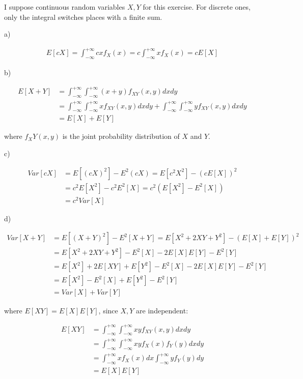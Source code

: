 I suppose continuous random variables $X,Y$ for this exercise. For discrete ones,
only the integral switches places with a finite sum.

a)

\begin{align*}
  E[cX] = \int_{-\infty}^{+\infty} cxf_X(x) = c\int_{-\infty}^{+\infty} xf_X(x) = cE[X]
\end{align*}

b)

\begin{align*}
  E[X+Y] &= \int_{-\infty}^{+\infty} \int_{-\infty}^{+\infty} (x+y)f_{XY}(x,y)dxdy \\
         &= \int_{-\infty}^{+\infty} \int_{-\infty}^{+\infty} xf_{XY}(x,y)dxdy + \int_{-\infty}^{+\infty} \int_{-\infty}^{+\infty} yf_{XY}(x,y)dxdy \\
         &= E[X] + E[Y]
\end{align*}

where $f_XY(x,y)$ is the joint probability distribution of $X$ and $Y$.

c)

\begin{align*}
  Var[cX] &= E[(cX)^2] - E^2(cX) = E[c^2X^2] - (cE[X])^2 \\
          &= c^2E[X^2] - c^2E^2[X] = c^2(E[X^2] - E^2[X]) \\
          &= c^2Var[X]
\end{align*}


d)

\begin{align*}
  Var[X+Y] &= E[(X+Y)^2] - E^2[X+Y] = E[X^2 + 2XY + Y^2] - (E[X]+E[Y])^2 \\
           &= E[X^2 + 2XY + Y^2] - E^2[X] - 2E[X]E[Y] - E^2[Y] \\
           &= E[X^2] + 2E[XY] + E[Y^2] - E^2[X] - 2E[X]E[Y] - E^2[Y] \\
           &= E[X^2] - E^2[X] + E[Y^2] - E^2[Y] \\
           &= Var[X] + Var[Y]
\end{align*}

where $E[XY] = E[X]E[Y]$, since $X,Y$ are independent:

\begin{align*}
  E[XY] &= \int_{-\infty}^{+\infty} \int_{-\infty}^{+\infty} xyf_{XY}(x,y)dxdy \\
        &= \int_{-\infty}^{+\infty} \int_{-\infty}^{+\infty} xyf_X(x)f_Y(y)dxdy \\
        &= \int_{-\infty}^{+\infty} xf_X(x)dx \int_{-\infty}^{+\infty} yf_Y(y)dy \\
        &= E[X]E[Y]
\end{align*}

